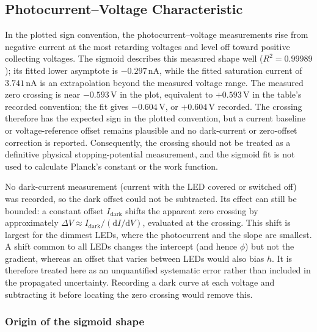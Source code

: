 \documentclass[12pt,a4paper]{article}
\begin{document}
\subsection{Photocurrent--Voltage Characteristic}

In the plotted sign convention, the photocurrent--voltage measurements rise from negative current at the most retarding voltages and level off toward positive collecting voltages. The sigmoid describes this measured shape well (\(R^2=0.99989\)); its fitted lower asymptote is \(-0.297\,\mathrm{nA}\), while the fitted saturation current of \(3.741\,\mathrm{nA}\) is an extrapolation beyond the measured voltage range. The measured zero crossing is near \(-0.593\,\mathrm{V}\) in the plot, equivalent to \(+0.593\,\mathrm{V}\) in the table's recorded convention; the fit gives \(-0.604\,\mathrm{V}\), or \(+0.604\,\mathrm{V}\) recorded. The crossing therefore has the expected sign in the plotted convention, but a current baseline or voltage-reference offset remains plausible and no dark-current or zero-offset correction is reported. Consequently, the crossing should not be treated as a definitive physical stopping-potential measurement, and the sigmoid fit is not used to calculate Planck's constant or the work function.

No dark-current measurement (current with the LED covered or switched off) was recorded, so the dark offset could not be subtracted. Its effect can still be bounded: a constant offset \(I_\mathrm{dark}\) shifts the apparent zero crossing by approximately \(\Delta V \approx I_\mathrm{dark}/(\mathrm{d}I/\mathrm{d}V)\), evaluated at the crossing. This shift is largest for the dimmest LEDs, where the photocurrent and the slope are smallest. A shift common to all LEDs changes the intercept (and hence \(\phi\)) but not the gradient, whereas an offset that varies between LEDs would also bias \(h\). It is therefore treated here as an unquantified systematic error rather than included in the propagated uncertainty. Recording a dark curve at each voltage and subtracting it before locating the zero crossing would remove this.

\subsubsection{Origin of the sigmoid shape}
\end{document}
